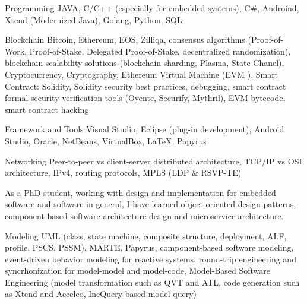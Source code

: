 


\begin{cvskills}

\cvskill
{Programming} %
{JAVA, C/C++ (especially for embedded systems), C\#, Androind, Xtend (Modernized Java), Golang, Python, SQL} %

\cvskill
{Blockchain}
{Bitcoin, Ethereum, EOS, Zilliqa, consensus algorithms (Proof-of-Work, Proof-of-Stake, Delegated Proof-of-Stake, decentralized randomization), blockchain scalability solutions (blockchain sharding, Plasma, State Chanel), Cryptocurrency, Cryptography, Ethereum Virtual Machine (EVM ), Smart Contract: Solidity, Solidity security best practices, debugging, smart contract formal security verification tools (Oyente, Securify, Mythril), EVM bytecode, smart contract hacking}

\cvskill
{Framework and Tools} %
{Visual Studio, Eclipse (plug-in development), Android Studio, Oracle, NetBeans, VirtualBox, LaTeX, Papyrus} %



\cvskill
{Networking}
{Peer-to-peer vs client-server distributed architecture, TCP/IP vs OSI architecture, IPv4, routing protocols, MPLS (LDP \& RSVP-TE)}


{As a PhD student, working with design and implementation for embedded software and software in general, I have learned object-oriented design patterns, component-based software architecture design and microservice architecture.}


\cvskill
{Modeling}
{UML (class, state machine, composite structure, deployment, ALF, profile, PSCS, PSSM), MARTE, Papyrus, component-based software modeling, event-driven behavior modeling for reactive systems, round-trip engineering and syncrhonization for model-model and model-code, Model-Based Software Engineering (model transformation such as QVT and ATL, code generation  such as Xtend and Acceleo, IncQuery-based model query)}



\end{cvskills}

